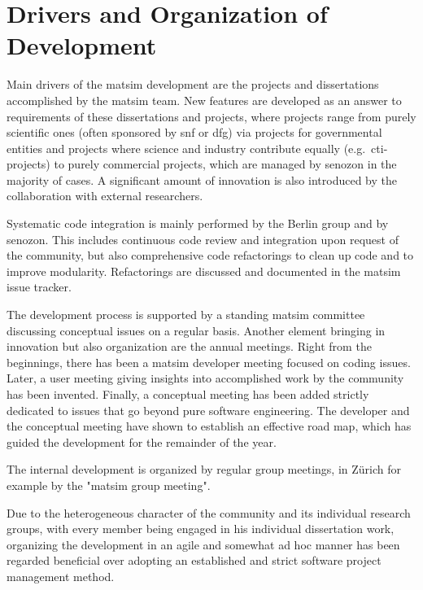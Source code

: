 \section{Drivers and Organization of Development}
Main drivers of the \gls{matsim} development are the projects and dissertations accomplished by the \gls{matsim} team. New features are developed as an answer to requirements of these dissertations and projects, where projects range 
%
from purely scientific ones (often sponsored by \gls{snf} or \gls{dfg}) 
%
via projects for governmental entities
%
and projects where science and industry contribute equally (e.g.\ \gls{cti}-projects) 
%
to purely 
commercial projects, which are managed by \gls{senozon} in the majority of cases. 
%
A significant amount of innovation is also introduced by the collaboration with external researchers.

Systematic code integration is mainly performed by the Berlin group and by \gls{senozon}. This includes continuous code review and integration upon request of the community, but also comprehensive code refactorings to clean up
code and to 
improve modularity.  Refactorings are discussed and documented in the \gls{matsim} issue tracker.

The development process is supported by a standing \gls{matsim} committee discussing conceptual issues on a regular basis. Another element bringing in innovation but also organization are the annual meetings. Right from the beginnings, there has been a \gls{matsim} developer meeting focused on coding issues. Later, a user meeting giving insights into accomplished work by the community has been invented. Finally, a conceptual meeting has been added strictly dedicated to issues that go beyond pure software engineering. The developer and the conceptual meeting have shown to establish an effective road map, which has guided the development for the remainder of the year. 

The internal development is organized by regular group meetings, in Zürich for example by the "\gls{matsim} group meeting".

Due to the heterogeneous character of the community and its individual research groups, with every member being engaged in his individual dissertation work, organizing the development in an agile and somewhat ad hoc manner has been regarded beneficial over adopting an established and strict software project management method.

